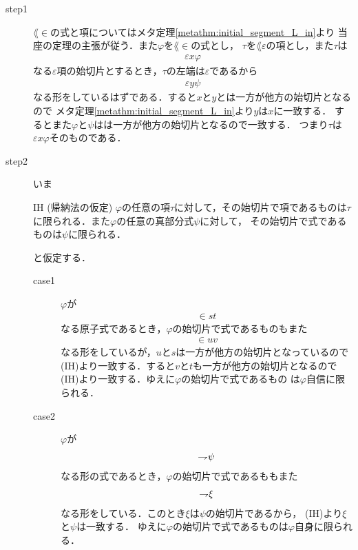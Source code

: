 	\begin{metaprf}\mbox{}
		\begin{description}
			\item[step1]
				$\lang{\in}$の式と項についてはメタ定理\ref{metathm:initial_segment_L_in}より
				当座の定理の主張が従う．また$\varphi$を$\lang{\in}$の式とし，
				$\tau$を$\lang{\varepsilon}$の項とし，また$\tau$は
				\begin{align}
					\varepsilon x \varphi
				\end{align}
				なる$\varepsilon$項の始切片とするとき，$\tau$の左端は$\varepsilon$であるから
				\begin{align}
					\varepsilon y \psi
				\end{align}
				なる形をしているはずである．すると$x$と$y$とは一方が他方の始切片となるので
				メタ定理\ref{metathm:initial_segment_L_in}より$y$は$x$に一致する．
				するとまた$\varphi$と$\psi$はは一方が他方の始切片となるので一致する．
				つまり$\tau$は$\varepsilon x \varphi$そのものである．
				
			\item[step2] いま
				\begin{itembox}[l]{IH (帰納法の仮定)}
					$\varphi$の任意の項$\tau$に対して，その始切片で項であるものは$\tau$
					に限られる．また$\varphi$の任意の真部分式$\psi$に対して，
					その始切片で式であるものは$\psi$に限られる．
				\end{itembox}
				と仮定する．
				\begin{description}
					\item[case1]
						$\varphi$が
						\begin{align}
							\in s t
						\end{align}
						なる原子式であるとき，$\varphi$の始切片で式であるものもまた
						\begin{align}
							\in u v
						\end{align}
						なる形をしているが，$u$と$s$は一方が他方の始切片となっているので
						(IH)より一致する．すると$v$と$t$も一方が他方の始切片となるので
						(IH)より一致する．ゆえに$\varphi$の始切片で式であるもの
						は$\varphi$自信に限られる．
						
					\item[case2] $\varphi$が
						\begin{align}
							\rightharpoondown\hspace{-0.25em} \psi
						\end{align}
						なる形の式であるとき，$\varphi$の始切片で式であるももまた
						\begin{align}
							\rightharpoondown\hspace{-0.25em} \xi
						\end{align}
						なる形をしている．このとき$\xi$は$\psi$の始切片であるから，
						(IH)より$\xi$と$\psi$は一致する．
						ゆえに$\varphi$の始切片で式であるものは$\varphi$自身に限られる．
			

\end{description}
\end{description}
\end{metaprf}
